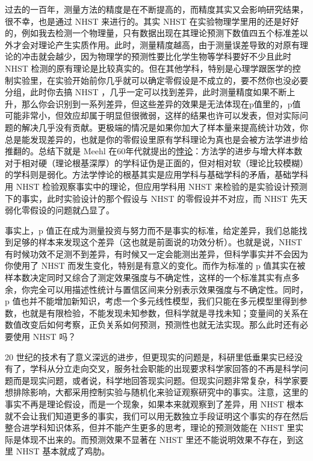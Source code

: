 \documentclass[]{tufte-book}
\begin{document}
过去的一百年，测量方法的精度是在不断提高的，而精度其实又会影响研究结果，很不幸，也是通过 NHST 来进行的。其实 NHST 在实验物理学里用的还是好好的，例如我去检测一个物理量，只有数据出现在其理论预测下数值四五个标准差以外才会对理论产生实质作用。此时，测量精度越高，由于测量误差导致的对原有理论的冲击就会越少，因为物理学的预测性要比化学生物等学科要好不少且此时 NHST 检测的原有理论是比较真实的。但在其他学科，特别是心理学跟医学的控制实验里，在实验开始前你几乎就可以确定零假设是不成立的，要不然你也没必要分组，此时你去搞 NHST ，几乎一定可以找到差异，此时测量精度如果不断上升，那么你会识别到一系列差异，但这些差异的效果是无法体现在p值里的，p值可能非常小，但效应却属于明显但很微弱，这样的结果也许可以发表，但对实际问题的解决几乎没有贡献。更极端的情况是如果你加大了样本量来提高统计功效，你总是能发现差异的，也就是你的零假设里原有学科理论为真也是会被方法学进步给推翻的。总结下就是 Meehl 在60年代就提出的\href{https://philpapers.org/rec/MEETIP}{悖论}：方法学的进步与增大样本数对于相对硬（理论根基深厚）的学科证伪是正面的，但对相对软（理论比较模糊）的学科则是弱化。方法学悖论的根基其实是应用学科与基础学科的矛盾，基础学科用 NHST 检验观察事实中的理论，但应用学科用 NHST 来检验的是实验设计预测下的事实，此时实验设计的那个假设与 NHST 的零假设并不对应，而 NHST 先天弱化零假设的问题就凸显了。

事实上，p 值正在成为测量投资与努力而不是事实的标准，给定差异，我们总能找到足够的样本来发现这个差异（这也就是前面说的功效分析）。也就是说，NHST 有时候功效不足测不到差异，有时候又一定会能测出差异，但科学事实并不会因为你使用了 NHST 而发生变化，特别是有意义的变化。而作为标准的 p 值其实在被样本数决定同时又综合了测定效果强度与不确定性，这样的一个标准其实有点多余，你完全可以用描述性统计与置信区间来分别表示效果强度与不确定性。同时，p 值也并不能增加新知识，考虑一个多元线性模型，我们只能在多元模型里得到参数，也就是有限检验，不能发现未知参数，但科学就是寻找未知；变量间的关系在数值改变后如何考察，正负关系如何预测，预测性也就无法实现。那么此时还有必要使用 NHST 吗？

20 世纪的技术有了意义深远的进步，但更现实的问题是，科研里低垂果实已经没有了，学科从分立走向交叉，服务社会职能的出现要求科学家回答的不再是科学问题而是现实问题，或者说，科学地回答现实问题。但现实问题非常复杂，科学家要想排除影响，大都采用控制实验与随机化来验证观察研究中的事实。注意，这里的事实不再是理论假设，而是一个现象，如果本来就观察到了差异，用 NHST 根本就不会让我们知道更多的事实，我们可以用无数独立手段证明这个事实的存在然后整合进学科知识体系，但并不能产生更多的思考，理论的预测效能在 NHST 里实际是体现不出来的。而预测效果不显著在 NHST 里还不能说明效果不存在，到这里 NHST 基本就成了鸡肋。
\end{document}
